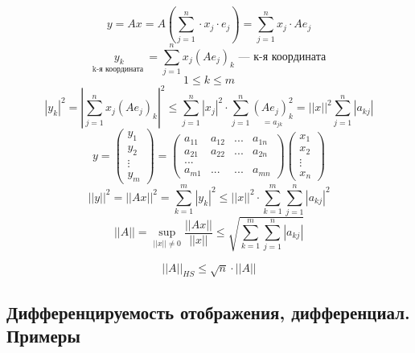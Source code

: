 \documentclass[main]{subfiles}
\begin{document}
	\begin{Proof}
		\[y = Ax = A(\sum_{j = 1}^n \cdot x_j \cdot e_j) = \sum^n_{j = 1} x_j \cdot Ae_j \]
		\[\underset{\text{k-я координата }}{y_k} = \sum^n_{j = 1}x_j(Ae_j)_k \text{ --- к-я координата} \]
		\[1 \leq k \leq m\]
		\[|y_k|^2 = |\sum^n_{j = 1} x_j (Ae_j)_k|^2 \leq \sum_{j = 1}^n |x_j|^2 \cdot
			\sum^n_{j=1} \underset{= a_{jk} }{(Ae_j)_k^2} = ||x||^2 \sum^n_{j = 1} |a_{kj}| \]
		\[y = \begin{pmatrix}
				y_1    \\
				y_2    \\
				\vdots \\
				y_m
			\end{pmatrix}
			= \begin{pmatrix}
				a_{11} & a_{12} & ... & a_{1n} \\
				a_{21} & a_{22} & ... & a_{2n} \\
				...                            \\
				a_{m1} & ...    & ... & a_{mn}
			\end{pmatrix}
			\begin{pmatrix}
				x_1    \\
				x_2    \\
				\vdots \\
				x_n
			\end{pmatrix}
		\]
		\[||y||^2 = ||Ax||^2 = \sum^m_{k = 1}|y_k|^2 \leq ||x||^2 \cdot \sum^m_{k = 1}\sum^n_{j = 1} |a_{kj}|^2\]
		\[||A|| = \sup_{||x|| \neq 0} \frac{||Ax||}{||x||} \leq \sqrt{\sum^m_{k = 1} \sum^n_{j = 1} |a_{kj}| }\]
	\end{Proof}

	\begin{Upr}
		\[||A||_{HS} \leq \sqrt{n} \cdot ||A||\]
	\end{Upr}

	\newpage
	\subsection{Дифференцируемость отображения, дифференциал. Примеры}
\end{document}
